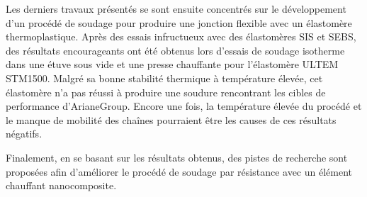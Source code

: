 Les derniers travaux présentés se sont ensuite concentrés sur le développement d'un procédé de soudage pour produire une jonction flexible avec un élastomère thermoplastique. 
Après des essais infructueux avec des élastomères SIS et SEBS, des résultats encourageants ont été obtenus lors d'essais de soudage isotherme dans une étuve sous vide et une presse chauffante pour l'élastomère ULTEM STM1500. 
Malgré sa bonne stabilité thermique à température élevée, cet élastomère n'a pas réussi à produire une soudure rencontrant les cibles de performance d'ArianeGroup. 
Encore une fois, la température élevée du procédé et le manque de mobilité des chaînes pourraient être les causes de ces résultats négatifs. 

Finalement, en se basant sur les résultats obtenus, des pistes de recherche sont proposées afin d'améliorer le procédé de soudage par résistance avec un élément chauffant nanocomposite. 





%
